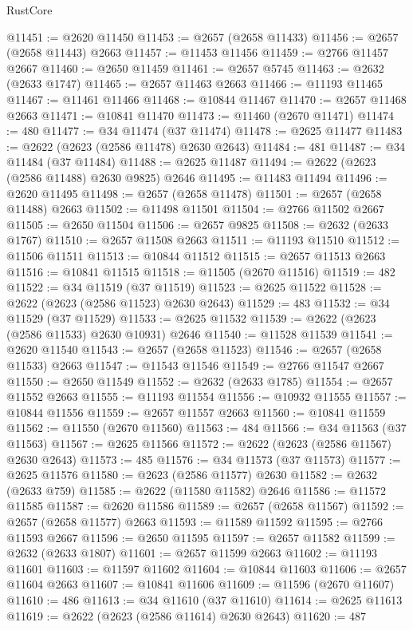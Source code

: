 \begin{lexlean}{RustCore}
\begin{coremodule}
@11451 := @2620 @11450
@11453 := @2657 (@2658 @11433)
@11456 := @2657 (@2658 @11443) @2663
@11457 := @11453 @11456
@11459 := @2766 @11457 @2667
@11460 := @2650 @11459
@11461 := @2657 @5745
@11463 := @2632 (@2633 @1747)
@11465 := @2657 @11463 @2663
@11466 := @11193 @11465
@11467 := @11461 @11466
@11468 := @10844 @11467
@11470 := @2657 @11468 @2663
@11471 := @10841 @11470
@11473 := @11460 (@2670 @11471)
@11474 := 480
@11477 := @34 @11474 (@37 @11474)
@11478 := @2625 @11477
@11483 := @2622 (@2623 (@2586 @11478) @2630 @2643)
@11484 := 481
@11487 := @34 @11484 (@37 @11484)
@11488 := @2625 @11487
@11494 := @2622 (@2623 (@2586 @11488) @2630 @9825) @2646
@11495 := @11483 @11494
@11496 := @2620 @11495
@11498 := @2657 (@2658 @11478)
@11501 := @2657 (@2658 @11488) @2663
@11502 := @11498 @11501
@11504 := @2766 @11502 @2667
@11505 := @2650 @11504
@11506 := @2657 @9825
@11508 := @2632 (@2633 @1767)
@11510 := @2657 @11508 @2663
@11511 := @11193 @11510
@11512 := @11506 @11511
@11513 := @10844 @11512
@11515 := @2657 @11513 @2663
@11516 := @10841 @11515
@11518 := @11505 (@2670 @11516)
@11519 := 482
@11522 := @34 @11519 (@37 @11519)
@11523 := @2625 @11522
@11528 := @2622 (@2623 (@2586 @11523) @2630 @2643)
@11529 := 483
@11532 := @34 @11529 (@37 @11529)
@11533 := @2625 @11532
@11539 := @2622 (@2623 (@2586 @11533) @2630 @10931) @2646
@11540 := @11528 @11539
@11541 := @2620 @11540
@11543 := @2657 (@2658 @11523)
@11546 := @2657 (@2658 @11533) @2663
@11547 := @11543 @11546
@11549 := @2766 @11547 @2667
@11550 := @2650 @11549
@11552 := @2632 (@2633 @1785)
@11554 := @2657 @11552 @2663
@11555 := @11193 @11554
@11556 := @10932 @11555
@11557 := @10844 @11556
@11559 := @2657 @11557 @2663
@11560 := @10841 @11559
@11562 := @11550 (@2670 @11560)
@11563 := 484
@11566 := @34 @11563 (@37 @11563)
@11567 := @2625 @11566
@11572 := @2622 (@2623 (@2586 @11567) @2630 @2643)
@11573 := 485
@11576 := @34 @11573 (@37 @11573)
@11577 := @2625 @11576
@11580 := @2623 (@2586 @11577) @2630
@11582 := @2632 (@2633 @759)
@11585 := @2622 (@11580 @11582) @2646
@11586 := @11572 @11585
@11587 := @2620 @11586
@11589 := @2657 (@2658 @11567)
@11592 := @2657 (@2658 @11577) @2663
@11593 := @11589 @11592
@11595 := @2766 @11593 @2667
@11596 := @2650 @11595
@11597 := @2657 @11582
@11599 := @2632 (@2633 @1807)
@11601 := @2657 @11599 @2663
@11602 := @11193 @11601
@11603 := @11597 @11602
@11604 := @10844 @11603
@11606 := @2657 @11604 @2663
@11607 := @10841 @11606
@11609 := @11596 (@2670 @11607)
@11610 := 486
@11613 := @34 @11610 (@37 @11610)
@11614 := @2625 @11613
@11619 := @2622 (@2623 (@2586 @11614) @2630 @2643)
@11620 := 487

\end{coremodule}
\end{lexlean}
